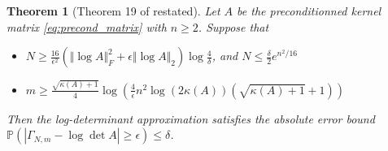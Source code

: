 \documentclass{article}
\newcommand{\vect}[1]{\boldsymbol{\mathbf{#1}}}
\newcommand{\norm}[1]{\Vert #1 \Vert}
\newtheorem{theorem}{Theorem}[section]
\newtheorem{observation}[theorem]{Observation}
\begin{document}

\begin{theorem}[{{Theorem 19 of \cite{cortinovis_randomized_2021} restated}}] \label{thm:cortinovis}
Let $A$ be the preconditionned kernel matrix \eqref{eq:precond_matrix} with $n \ge 2$. Suppose that 
\begin{itemize}
    \item $N \ge \frac{16}{\epsilon^2} (\norm{\log A}_F^2 + \epsilon \norm{\log A}_2) \log\frac{4}{\delta}$, and $N \le \frac{\delta}{2} e^{n^2/16}$
    \item $m \ge \frac{\sqrt{\kappa(A) + 1}}{4} \log\left( \frac{4}{\epsilon} n^2 \log(2\kappa(A)) (\sqrt{\kappa(A) + 1} + 1) \right)$
\end{itemize}
Then the log-determinant approximation satisfies the absolute error bound $\mathbb P( | \Gamma_{N, m} - \log\det A | \ge \epsilon) \le \delta$.
\end{theorem}

\end{document}
